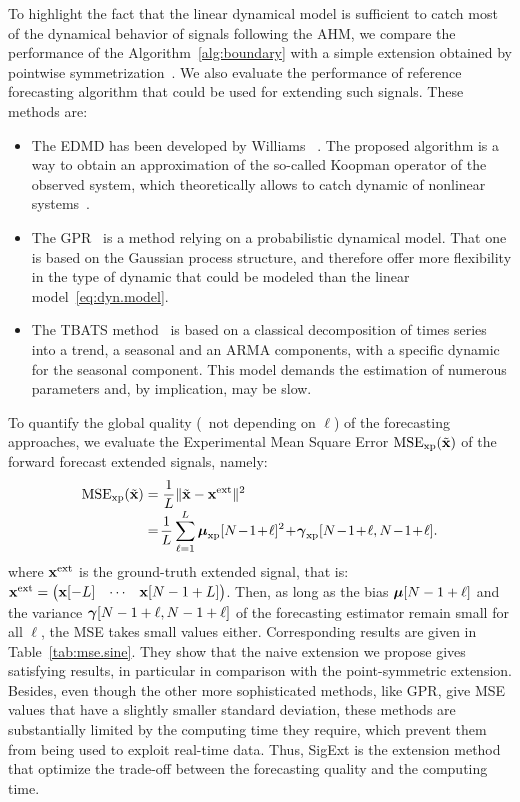 To highlight the fact that the linear dynamical model is sufficient to catch most of the dynamical behavior of signals following the AHM, we compare the performance of the Algorithm~\ref{alg:boundary} with a simple extension obtained by pointwise symmetrization~\cite{Kharitonenko02wavelet}. We also evaluate the performance of reference forecasting algorithm that could be used for extending such signals. These methods are:
\begin{itemize}
\item The EDMD has been developed by Williams \etal~\cite{Williams15data}. The proposed algorithm is a way to obtain an approximation of the so-called Koopman operator of the observed system, which theoretically allows to catch dynamic of nonlinear systems~\cite{Korda18linear}.
\item The GPR~\cite{Rasmussen06gaussian} is a method relying on a probabilistic dynamical model. That one is based on the Gaussian process structure, and therefore offer more flexibility in the type of dynamic that could be modeled than the linear model~\eqref{eq:dyn.model}.
\item The TBATS method~\cite{DeLivera11forecasting} is based on a classical decomposition of times series into a trend, a seasonal and an ARMA components, with a specific dynamic for the seasonal component. This model demands the estimation of numerous parameters and, by implication, may be slow. 
\end{itemize}

To quantify the global quality (\ie~not depending on $\ell$) of the forecasting approaches, we evaluate the Experimental Mean Square Error $\mathrm{MSE_{xp}}(\tilde{{\mathbf x}})$ of the forward forecast extended signals, namely:
\begin{align}
\label{eq:mse}
\mathrm{MSE_{\xp}}(\tilde\bx) &= \dfrac1{L}\|\tilde\bx -\bx^\mathrm{ext}\|^2 \\[-1mm]
\nonumber
&=\! \dfrac1{L}\sum_{\ell=1}^L \bmu_{\xp}[N\!-\!1\!+\!\ell]^2 \!+\! \bgamma_{\xp}[N\!-\!1\!+\!\ell,N\!-\!1\!+\!\ell] .
\end{align}
where ${\mathbf x}^\mathrm{ext}$ is the ground-truth extended signal, that is: ${\mathbf x}^\mathrm{ext} = \begin{pmatrix}{\mathbf x}[-L] & \cdots & {\mathbf x}[N-1+L] \end{pmatrix}$. Then, as long as the bias $\boldsymbol{\mu}[N-1+\ell]$ and the variance $\boldsymbol{\gamma}[N-1+\ell,N-1+\ell]$ of the forecasting estimator remain small for all $\ell$, the MSE takes small values either. Corresponding results are given in Table~\ref{tab:mse.sine}. They show that the naive extension we propose gives satisfying results, in particular in comparison with the point-symmetric extension. Besides, even though the other more sophisticated methods, like GPR, give MSE values that have a slightly smaller standard deviation, these methods are substantially limited by the computing time they require, which prevent them from being used to exploit real-time data. Thus, {\sf SigExt} is the extension method that optimize the trade-off between the forecasting quality and the computing time. %

